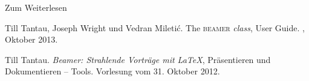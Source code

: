 \begin{Frame}{Zum Weiterlesen}
  \begin{mybib}
      Till Tantau, Joseph Wright und Vedran Mileti\'c.
      \newblock The \textsc{beamer} \textit{class}, User Guide.
      \newblock {}, Oktober 2013.

      Till Tantau.
      \newblock \emph{Beamer: Strahlende Vorträge mit \LaTeX},
      \newblock Präsentieren und Dokumentieren -- Tools.
      \newblock Vorlesung vom 31. Oktober 2012.
  \end{mybib}
\end{Frame}

